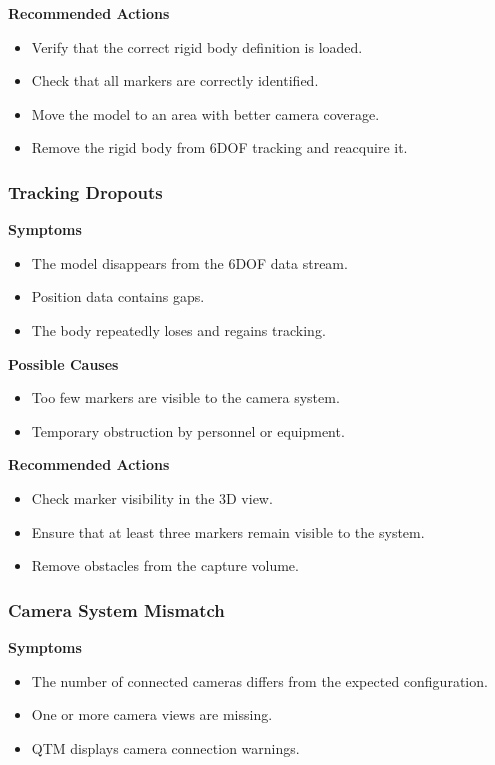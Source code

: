 \documentclass[12pt,a4paper]{article}
\begin{document}
\textbf{Recommended Actions}
\begin{itemize}
	\item Verify that the correct rigid body definition is loaded.
	\item Check that all markers are correctly identified.
	\item Move the model to an area with better camera coverage.
	\item Remove the rigid body from 6DOF tracking and reacquire it.
\end{itemize}

\subsubsection{Tracking Dropouts}

\textbf{Symptoms}
\begin{itemize}
	\item The model disappears from the 6DOF data stream.
	\item Position data contains gaps.
	\item The body repeatedly loses and regains tracking.
\end{itemize}

\textbf{Possible Causes}
\begin{itemize}
	\item Too few markers are visible to the camera system.
	\item Temporary obstruction by personnel or equipment.
\end{itemize}

\textbf{Recommended Actions}
\begin{itemize}
	\item Check marker visibility in the 3D view.
	\item Ensure that at least three markers remain visible to the system.
	\item Remove obstacles from the capture volume.
\end{itemize}

\subsubsection{Camera System Mismatch}

\textbf{Symptoms}
\begin{itemize}
	\item The number of connected cameras differs from the expected configuration.
	\item One or more camera views are missing.
	\item QTM displays camera connection warnings.
\end{itemize}
\end{document}
